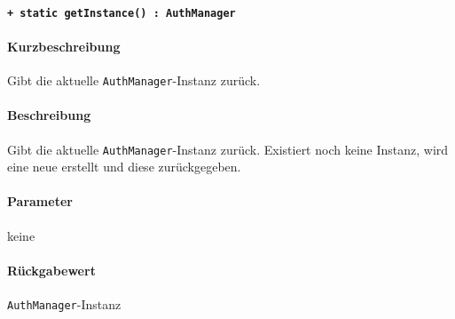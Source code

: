 \paragraph{\texttt{+ static getInstance() : AuthManager}}%
\paragraph*{Kurzbeschreibung}
Gibt die aktuelle \verb#AuthManager#-Instanz zurück.
\paragraph*{Beschreibung}
Gibt die aktuelle \verb#AuthManager#-Instanz zurück.
Existiert noch keine Instanz, wird eine neue erstellt und diese zurückgegeben.
\paragraph*{Parameter}
keine
\paragraph*{Rückgabewert}
\verb#AuthManager#-Instanz